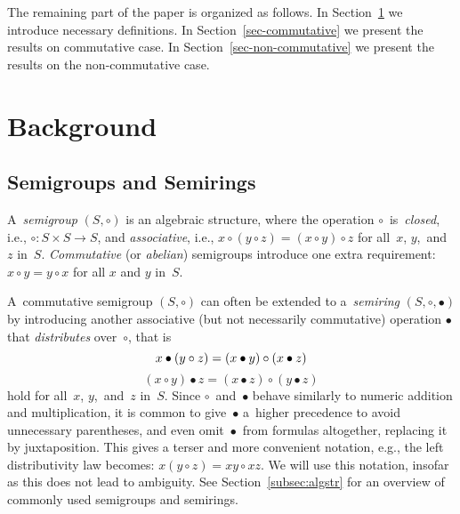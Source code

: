 \documentclass[review,onefignum,onetabnum]{siamart190516}
\begin{document}
The remaining part of the paper is organized as follows. In
Section~\ref{sec:background} we introduce necessary definitions. In
Section~\ref{sec-commutative} we present the results on commutative case. In
Section~\ref{sec-non-commutative} we present the results on the non-commutative
case.

\section{Background} \label{sec:background}
\subsection{Semigroups and Semirings}
A~\emph{semigroup} $(S, \circ)$ is an algebraic structure, where
the operation
$\circ$~is~\emph{closed}, i.e., $\circ : S\times S \rightarrow S$,
and
\emph{associative}, i.e.,
$x \circ (y \circ z) = (x \circ y) \circ z$ for all~$x$, $y$,~and~$z$
in~$S$.
\emph{Commutative} (or \emph{abelian}) semigroups introduce
one extra requirement: $x \circ y = y \circ x$ for all $x$ and $y$
in~$S$.

A~commutative semigroup $(S, \circ)$ can often be extended to
a~\emph{semiring} $(S, \circ, \bullet)$ by introducing
another associative (but not necessarily
commutative)
operation $\bullet$ that \emph{distributes} over~$\circ$, that is
\[
x \bullet (y \circ z) = (x \bullet y) \circ (x \bullet z)\\
\]
\[
(x \circ y) \bullet z = (x \bullet z) \circ (y \bullet z)
\]
hold for all~$x$, $y$,~and~$z$ in~$S$.
Since $\circ$~and~$\bullet$ behave
similarly to numeric addition and multiplication, it is common to
give~$\bullet$ a~higher precedence to avoid
unnecessary parentheses, and even omit~$\bullet$~from
formulas altogether, replacing it by juxtaposition.
This gives a terser and
more convenient notation, e.g., the left distributivity law becomes:
$x (y \circ z) = x y \circ x z$. We will use this notation,
insofar as this does not lead to ambiguity. See Section~\ref{subsec:algstr} for
an overview of commonly used semigroups and semirings.
\end{document}
